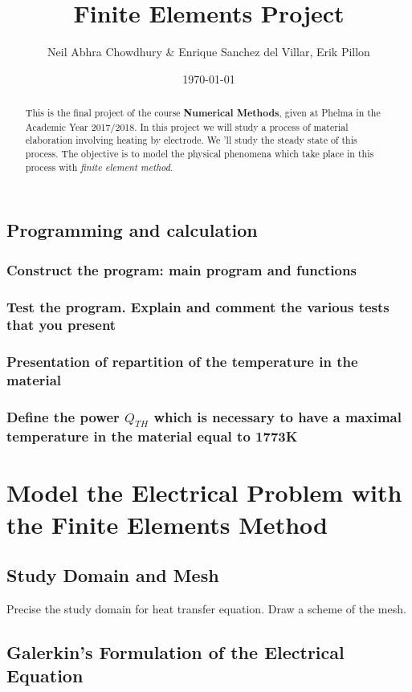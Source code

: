 \documentclass{article}
\begin{document}
\date{\today}
\author{Neil Abhra Chowdhury \& Enrique Sanchez del Villar, Erik Pillon}
\title{Finite Elements Project}
\maketitle
\begin{abstract}
	This is the final project of the course \textbf{Numerical Methods}, given at Phelma in the Academic Year 2017/2018. In this project we will study a process of material elaboration involving heating by electrode. We 'll study the steady state of this process. The objective is to model the physical phenomena which take place in this process with \emph{finite element method}.
\end{abstract}



\subsection{Programming and calculation}
\subsubsection{Construct the program: main program and functions}
\subsubsection{Test the program. Explain and comment the various tests that you present}

\subsubsection{Presentation of repartition of the temperature in the material}

\subsubsection{Define the power $ Q_{TH} $ which is necessary to have a maximal temperature in the material equal to 1773K}

\section{Model the Electrical Problem with the Finite Elements Method}
\subsection{Study Domain and Mesh}
Precise the study domain for heat transfer equation. Draw a scheme of the mesh.
\subsection{Galerkin’s Formulation of the Electrical Equation}
\end{document}

